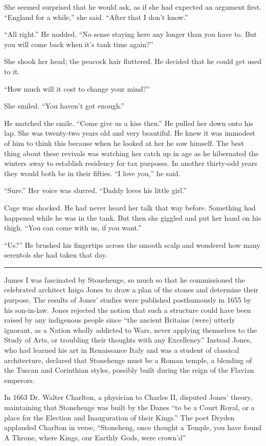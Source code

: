 She seemed surprised that he would ask, as if she had expected an argument first. ``England for a while,'' she said. ``After that I don't know.''

``All right.'' He nodded. ``No sense staying here any longer than you have to. But you will come back when it's tank time again?''

She shook her head; the peacock hair fluttered. He decided that he could get used to it.

``How much will it cost to change your mind?''

She smiled. ``You haven't got enough.''

He matched the smile. ``Come give us a kiss then.'' He pulled her down onto his lap. She was twenty-two years old and very beautiful. He knew it was immodest of him to think this because when he looked at her he saw himself. The best thing about these revivals was watching her catch up in age as he hibernated the winters away to establish residency for tax purposes. In another thirty-odd years they would both be in their fifties. ``I love you,'' he said.

``Sure.'' Her voice was slurred. ``Daddy loves his little girl.''

Cage was shocked. He had never heard her talk that way before. Something had happened while he was in the tank. But then she giggled and put her hand on his thigh. ``You can come with us, if you want.''

``Us?'' He brushed his fingertips across the smooth scalp and wondered how many serentols she had taken that day.

\fancybreak{* * *}

James I was fascinated by Stonehenge, so much so that he commissioned the celebrated architect Inigo Jones to draw a plan of the stones and determine their purpose. The results of Jones' studies were published posthumously in 1655 by his son-in-law. Jones rejected the notion that such a structure could have been raised by any indigenous people since ``the ancient Britains (were) utterly ignorant, as a Nation wholly addicted to Wars, never applying themselves to the Study of Arts, or troubling their thoughts with any Excellency.'' Instead Jones, who had learned his art in Renaissance Italy and was a student of classical architecture, declared that Stonehenge must be a Roman temple, a blending of the Tuscan and Corinthian styles, possibly built during the reign of the Flavian emperors.

In 1663 Dr. Walter Charlton, a physician to Charles II, disputed Jones' theory, maintaining that Stonehenge was built by the Danes ``to be a Court Royal, or a place for the Election and Inauguration of their Kings.'' The poet Dryden applauded Charlton in verse, ``Stoneheng, once thought a Temple, you have found A Throne, where Kings, our Earthly Gods, were crown'd''


